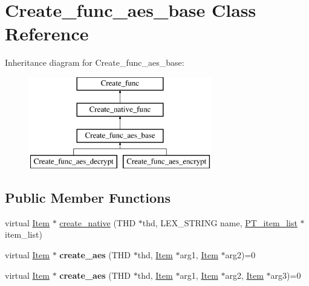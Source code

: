 \hypertarget{classCreate__func__aes__base}{}\section{Create\+\_\+func\+\_\+aes\+\_\+base Class Reference}
\label{classCreate__func__aes__base}
Inheritance diagram for Create\+\_\+func\+\_\+aes\+\_\+base\+:\begin{figure}[H]
\begin{center}
\leavevmode
\includegraphics[height=4.000000cm]{classCreate__func__aes__base}
\end{center}
\end{figure}
\subsection*{Public Member Functions}
\begin{DoxyCompactItemize}
\item 
virtual \mbox{\hyperlink{classItem}{Item}} $\ast$ \mbox{\hyperlink{classCreate__func__aes__base_a08aeb5f62e341f0d8e63972b7309aed6}{create\+\_\+native}} (T\+HD $\ast$thd, L\+E\+X\+\_\+\+S\+T\+R\+I\+NG name, \mbox{\hyperlink{classPT__item__list}{P\+T\+\_\+item\+\_\+list}} $\ast$item\+\_\+list)
\item 
\mbox{\label{classCreate__func__aes__base_a7b0dc7070a557a6a6ac29131cfee6228}} 
virtual \mbox{\hyperlink{classItem}{Item}} $\ast$ {\bfseries create\+\_\+aes} (T\+HD $\ast$thd, \mbox{\hyperlink{classItem}{Item}} $\ast$arg1, \mbox{\hyperlink{classItem}{Item}} $\ast$arg2)=0
\item 
\mbox{\label{classCreate__func__aes__base_a6cf3a2996e3bfa887dc89b7ddbd2ddf0}} 
virtual \mbox{\hyperlink{classItem}{Item}} $\ast$ {\bfseries create\+\_\+aes} (T\+HD $\ast$thd, \mbox{\hyperlink{classItem}{Item}} $\ast$arg1, \mbox{\hyperlink{classItem}{Item}} $\ast$arg2, \mbox{\hyperlink{classItem}{Item}} $\ast$arg3)=0
\end{DoxyCompactItemize}
